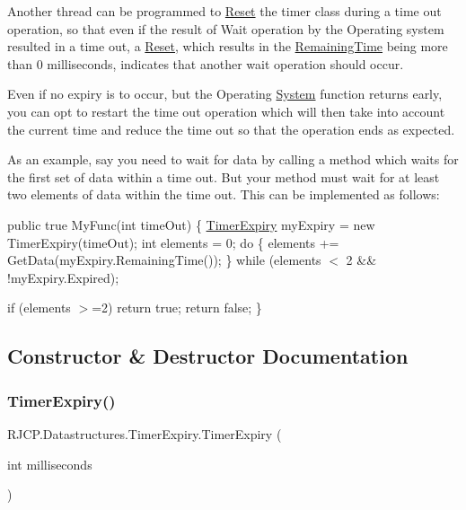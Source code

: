 Another thread can be programmed to \mbox{\hyperlink{class_r_j_c_p_1_1_datastructures_1_1_timer_expiry_ad2241fbbdbbe1423b50f4b4b54ccbed1}{Reset}} the timer class during a time out operation, so that even if the result of Wait operation by the Operating system resulted in a time out, a \mbox{\hyperlink{class_r_j_c_p_1_1_datastructures_1_1_timer_expiry_ad2241fbbdbbe1423b50f4b4b54ccbed1}{Reset}}, which results in the \mbox{\hyperlink{class_r_j_c_p_1_1_datastructures_1_1_timer_expiry_aae9e5e2c9c3f6d30001e4fb04abf2244}{Remaining\+Time}} being more than 0 milliseconds, indicates that another wait operation should occur.

Even if no expiry is to occur, but the Operating \mbox{\hyperlink{namespace_system}{System}} function returns early, you can opt to restart the time out operation which will then take into account the current time and reduce the time out so that the operation ends as expected.

As an example, say you need to wait for data by calling a method which waits for the first set of data within a time out. But your method must wait for at least two elements of data within the time out. This can be implemented as follows\+:

public true My\+Func(int time\+Out) \{ \mbox{\hyperlink{class_r_j_c_p_1_1_datastructures_1_1_timer_expiry}{Timer\+Expiry}} my\+Expiry = new Timer\+Expiry(time\+Out); int elements = 0; do \{ elements += Get\+Data(my\+Expiry.\+Remaining\+Time()); \} while (elements $<$ 2 \&\& !my\+Expiry.Expired);

if (elements $>$=2) return true; return false; \} 

\subsection{Constructor \& Destructor Documentation}
\mbox{\label{class_r_j_c_p_1_1_datastructures_1_1_timer_expiry_a6474d821e4ace9b45cf91c074fdd2956}} 
\subsubsection{\texorpdfstring{TimerExpiry()}{TimerExpiry()}}
{\footnotesize\ttfamily R\+J\+C\+P.\+Datastructures.\+Timer\+Expiry.\+Timer\+Expiry (\begin{DoxyParamCaption}\item[{int}]{milliseconds }\end{DoxyParamCaption})}



